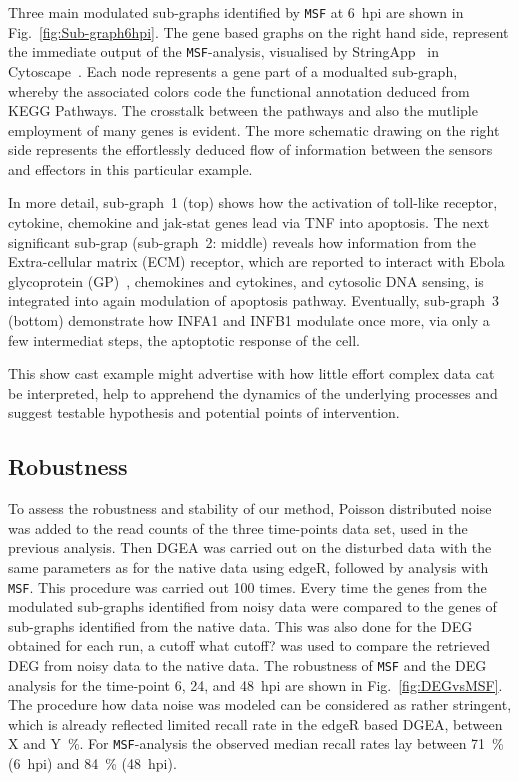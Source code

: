 \documentclass[10pt,a4paper,twocolumn]{article}
\newcommand{\TODO}[1]{\begingroup\color{red}#1\endgroup}
\begin{document}
 Three main modulated sub-graphs identified by \texttt{MSF} at 6~hpi are
 shown in Fig.~\ref{fig:Sub-graph6hpi}. The gene based graphs on the right
 hand side, represent the immediate output of the \texttt{MSF}-analysis,
 visualised by StringApp~\cite{StringApp} in Cytoscape~\cite{Cyto}. Each
 node represents a gene part of a modualted sub-graph, whereby the
 associated colors code the functional annotation deduced from KEGG
 Pathways. The crosstalk between the pathways and also the mutliple
 employment of many genes is evident. The more schematic drawing on the
 right side represents the effortlessly deduced flow of information between
 the sensors and effectors in this particular example.

 In more detail, sub-graph~1 (top) shows how the activation of toll-like
 receptor, cytokine, chemokine and jak-stat genes lead via TNF into
 apoptosis. The next significant sub-grap (sub-graph~2: middle) reveals how
 information from the Extra-cellular matrix (ECM) receptor, which are
 reported to interact with Ebola glycoprotein (GP)~\cite{Veljkovic},
 chemokines and cytokines, and cytosolic DNA sensing, is integrated into
 again modulation of apoptosis pathway. Eventually, sub-graph~3 (bottom)
 demonstrate how INFA1 and INFB1 modulate once more, via only a few
 intermediat steps, the aptoptotic response of the cell.

 This show cast example might advertise with how little effort complex data
 cat be interpreted, help to apprehend the dynamics of the underlying
 processes and suggest testable hypothesis and potential points of
 intervention.
 
 \subsection*{Robustness}
 
 To assess the robustness and stability of our method, Poisson distributed
 noise was added to the read counts of the three time-points data set, used
 in the previous analysis. Then DGEA was carried out on the disturbed data
 with the same parameters as for the native data using edgeR, followed by
 analysis with \texttt{MSF}. This procedure was carried out 100 times.
 Every time the genes from the modulated sub-graphs identified from noisy
 data were compared to the genes of sub-graphs identified from the native
 data. This was also done for the DEG obtained for each run, a cutoff
 \TODO{what cutoff?} was used to compare the retrieved DEG from noisy data
 to the native data.  The robustness of \texttt{MSF} and the DEG analysis
 for the time-point 6, 24, and 48~hpi are shown in
 Fig.~\ref{fig:DEGvsMSF}. The procedure how data noise was modeled can be
 considered as rather stringent, which is already reflected limited recall
 rate in the edgeR based DGEA, between \TODO{X and Y~\%}. For
 \texttt{MSF}-analysis the observed median recall rates lay between 71~\%
 (6~hpi) and 84~\% (48~hpi).
\end{document}
